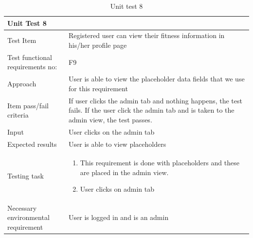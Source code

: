 \begin{table}[H]
\begin{tabular}{ | L{0.25\linewidth} | L{0.75\linewidth} | } 
 \hline {}
 Unit Test 8 &  \\
 \hline
 Test Item & Registered user can view their fitness information in his/her profile page\\ 
 \hline
 Test functional requirements no: & F9
 \\ 
 \hline
 Approach & User is able to view the placeholder data fields that we use for this requirement\\ 
  \hline
 Item pass/fail criteria &  If user clicks the admin tab and nothing happens, the test fails. If the user click the admin tab and is taken to the admin view, the test passes.\\ 
 \hline
 Input & User clicks on the admin tab\\ 
 \hline
 Expected results & User is able to view placeholders\\ 
  \hline
Testing task & 
\vspace{-5mm}
    \begin{enumerate}[noitemsep]
  \item[] This requirement is done with placeholders and these are placed in the admin view.
  \item User clicks on admin tab
   \end{enumerate}\\
 \hline
 Necessary environmental requirement & User is logged in and is an admin\\ 
 \hline
\end{tabular}
\caption{Unit test 8}
\end{table}

